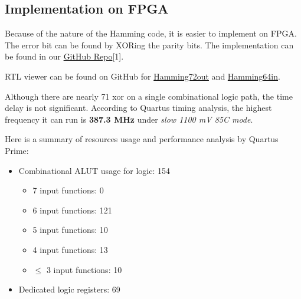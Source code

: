 \documentclass[conference]{IEEEtran}
\begin{document}
\subsection{Implementation on FPGA}

Because of the nature of the Hamming code, it is easier to implement on FPGA.
The error bit can be found by XORing the parity bits. The implementation can be
found in our \href{https://github.com/luckunately/ELEC433-Projects}{GitHub
  Repo}[1]. %

  RTL viewer can be found on GitHub for \href{https://github.com/luckunately/ELEC433-Projects/blob/add-tex/Hamming72out/Hamming72out_RTL.pdf}{Hamming72out} and \href{https://github.com/luckunately/ELEC433-Projects/blob/add-tex/Hamming64in/Hamming64inRTL.pdf}{Hamming64in}.

Although there are nearly 71 xor on a single combinational logic path, the time
delay is not significant. According to Quartus timing analysis, the highest
frequency it can run is \textbf{387.3 MHz} under \textit{slow 1100 mV 85C
  mode}.

Here is a summary of resources usage and performance analysis by Quartus Prime:
\begin{itemize}
  \item Combinational ALUT usage for logic: 154
  \begin{itemize}
    \item 7 input functions: 0
    \item 6 input functions: 121
    \item 5 input functions: 10
    \item 4 input functions: 13
    \item $\leq$ 3 input functions: 10
  \end{itemize}
  \item Dedicated logic registers: 69
\end{itemize}

\end{document}

